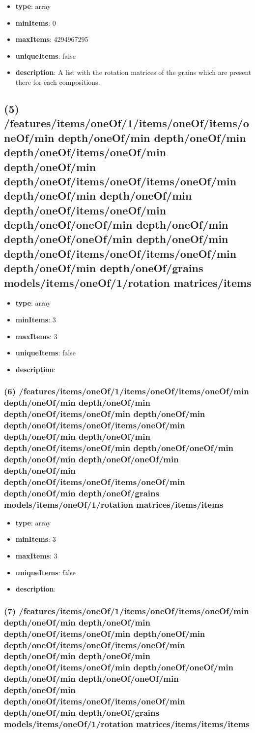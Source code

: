 \begin{itemize}[leftmargin=4em]\item {\bf type}: array
\item {\bf minItems}: 0
\item {\bf maxItems}: 4294967295
\item {\bf uniqueItems}: false
\item {\bf description}: A list with the rotation matrices of the grains which are present there for each compositions.
\end{itemize}\subsection{(5) /features/items/oneOf/1/items/oneOf/items/oneOf/min depth/oneOf/min depth/oneOf/min depth/oneOf/items/oneOf/min depth/oneOf/min depth/oneOf/items/oneOf/items/oneOf/min depth/oneOf/min depth/oneOf/min depth/oneOf/items/oneOf/min depth/oneOf/oneOf/min depth/oneOf/min depth/oneOf/oneOf/min depth/oneOf/min depth/oneOf/items/oneOf/items/oneOf/min depth/oneOf/min depth/oneOf/grains models/items/oneOf/1/rotation matrices/items}
\begin{itemize}[leftmargin=5em]\item {\bf type}: array
\item {\bf minItems}: 3
\item {\bf maxItems}: 3
\item {\bf uniqueItems}: false
\item {\bf description}: 
\end{itemize}\subsubsection{(6) /features/items/oneOf/1/items/oneOf/items/oneOf/min depth/oneOf/min depth/oneOf/min depth/oneOf/items/oneOf/min depth/oneOf/min depth/oneOf/items/oneOf/items/oneOf/min depth/oneOf/min depth/oneOf/min depth/oneOf/items/oneOf/min depth/oneOf/oneOf/min depth/oneOf/min depth/oneOf/oneOf/min depth/oneOf/min depth/oneOf/items/oneOf/items/oneOf/min depth/oneOf/min depth/oneOf/grains models/items/oneOf/1/rotation matrices/items/items}
\begin{itemize}[leftmargin=6em]\item {\bf type}: array
\item {\bf minItems}: 3
\item {\bf maxItems}: 3
\item {\bf uniqueItems}: false
\item {\bf description}: 
\end{itemize}\subsubsection{(7) /features/items/oneOf/1/items/oneOf/items/oneOf/min depth/oneOf/min depth/oneOf/min depth/oneOf/items/oneOf/min depth/oneOf/min depth/oneOf/items/oneOf/items/oneOf/min depth/oneOf/min depth/oneOf/min depth/oneOf/items/oneOf/min depth/oneOf/oneOf/min depth/oneOf/min depth/oneOf/oneOf/min depth/oneOf/min depth/oneOf/items/oneOf/items/oneOf/min depth/oneOf/min depth/oneOf/grains models/items/oneOf/1/rotation matrices/items/items/items}
